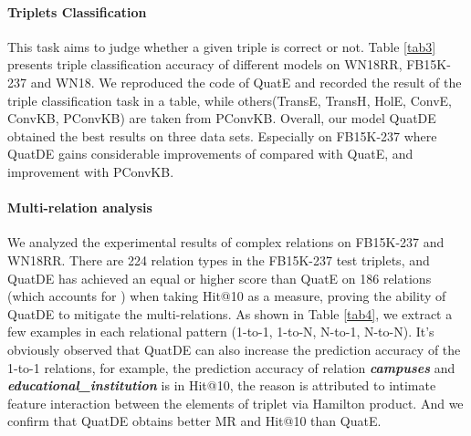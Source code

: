 \documentclass[letterpaper]{article} \usepackage{aaai20}  \usepackage{times}  \usepackage{helvet} \usepackage{courier}  \usepackage[hyphens]{url}  \usepackage{graphicx} \usepackage{lineno,hyperref,amsmath,amssymb}
\begin{document}
\paragraph{\textbf{Triplets Classification}}This task aims to judge whether a given triple  is correct or not. Table \ref{tab3} presents triple classification accuracy of different models on WN18RR, FB15K-237 and WN18. We reproduced the code of QuatE and recorded the result of the triple classification task in a table, while others(TransE\cite{bordes2013translating}, TransH\cite{wang2014knowledge}, HolE\cite{nickel2016holographic}, ConvE\cite{dettmers2018convolutional}, ConvKB\cite{nguyen2017novel}, PConvKB\cite{jia2020improving}) are taken from PConvKB\cite{jia2020improving}. Overall, our model QuatDE obtained the best results on three data sets. Especially on FB15K-237 where QuatDE gains considerable improvements of  compared with QuatE, and  improvement with PConvKB.

\begin{table}[h]
\centering
{}
\caption{\textbf{Triplets classification result.}}
\label{tab3}
\end{table}

\paragraph{\textbf{Multi-relation analysis}}We analyzed the experimental results of complex relations on FB15K-237 and WN18RR. There are 224 relation types in the FB15K-237 test triplets, and QuatDE has achieved an equal or higher score than QuatE on 186 relations (which accounts for ) when taking Hit@10 as a measure, proving the ability of QuatDE to mitigate the multi-relations. As shown in Table \ref{tab4}, we extract a few examples in each relational pattern (1-to-1, 1-to-N, N-to-1, N-to-N). It’s obviously observed that QuatDE can also increase the prediction accuracy of the 1-to-1 relations, for example, the prediction accuracy of relation \textbf{\textit{campuses}} and \textbf{\textit{educational\_institution}} is  in Hit@10, the reason is attributed to intimate feature interaction between the elements of triplet via Hamilton product. And we confirm that QuatDE obtains better MR and Hit@10 than QuatE.
\end{document}
